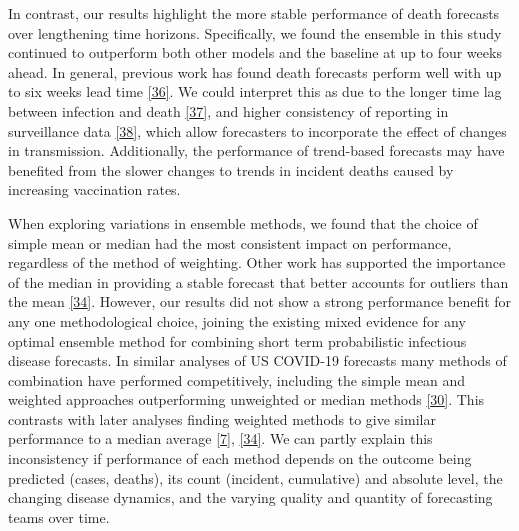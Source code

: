 \documentclass[
]{article}
\begin{document}
In contrast, our results highlight the more stable performance of death
forecasts over lengthening time horizons. Specifically, we found the
ensemble in this study continued to outperform both other models and the
baseline at up to four weeks ahead. In general, previous work has found
death forecasts perform well with up to six weeks lead time
\protect\hyperlink{ref-friedmanPredictivePerformanceInternational2021}{{[}36{]}}.
We could interpret this as due to the longer time lag between infection
and death \protect\hyperlink{ref-jinLagDailyReported2021}{{[}37{]}}, and
higher consistency of reporting in surveillance data
\protect\hyperlink{ref-catalaRobustEstimationDiagnostic2021}{{[}38{]}},
which allow forecasters to incorporate the effect of changes in
transmission. Additionally, the performance of trend-based forecasts may
have benefited from the slower changes to trends in incident deaths
caused by increasing vaccination rates.

When exploring variations in ensemble methods, we found that the choice
of simple mean or median had the most consistent impact on performance,
regardless of the method of weighting. Other work has supported the
importance of the median in providing a stable forecast that better
accounts for outliers than the mean
\protect\hyperlink{ref-brooksComparingEnsembleApproaches2020}{{[}34{]}}.
However, our results did not show a strong performance benefit for any
one methodological choice, joining the existing mixed evidence for any
optimal ensemble method for combining short term probabilistic
infectious disease forecasts. In similar analyses of US COVID-19
forecasts many methods of combination have performed competitively,
including the simple mean and weighted approaches outperforming
unweighted or median methods
\protect\hyperlink{ref-taylorCombiningProbabilisticForecasts2021}{{[}30{]}}.
This contrasts with later analyses finding weighted methods to give
similar performance to a median average
\protect\hyperlink{ref-rayEnsembleForecastsCoronavirus2020e}{{[}7{]}},
\protect\hyperlink{ref-brooksComparingEnsembleApproaches2020}{{[}34{]}}.
We can partly explain this inconsistency if performance of each method
depends on the outcome being predicted (cases, deaths), its count
(incident, cumulative) and absolute level, the changing disease
dynamics, and the varying quality and quantity of forecasting teams over
time.
\end{document}

